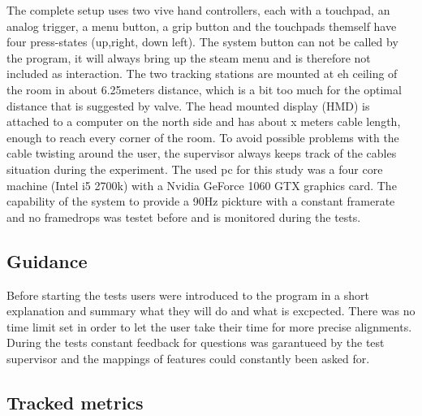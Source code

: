 \documentclass[hyperref,english,bachelorofscience,bibnum]{cgvpub}
\begin{document}
The complete setup uses two vive hand controllers, each with a touchpad, an analog trigger, a menu button, a grip button and the touchpads themself have four press-states (up,right, down left). The system button can not be called by the program, it will always bring up the steam menu and is therefore not included as interaction. The two tracking stations are mounted at eh ceiling of the room in about 6.25meters distance, which is a bit too much for the optimal distance that is suggested by valve. The head mounted display (HMD) is attached to a computer on the north side and has about x meters cable length, enough to reach every corner of the room. To avoid possible problems with the cable twisting around the user, the supervisor always keeps track of the cables situation during the experiment.
The used pc for this study was a four core machine (Intel i5 2700k) with a Nvidia GeForce 1060 GTX graphics card. The capability of the system to provide a 90Hz pickture with a constant framerate and no framedrops was testet before and is monitored during the tests.

\subsection{Guidance}

Before starting the tests users were introduced to the program in a short explanation and summary what they will do and what is excpected. There was no time limit set in order to let the user take their time for more precise alignments. During the tests constant feedback for questions was garantueed by the test supervisor and the mappings of features could constantly been asked for.

\subsection{Tracked metrics}
\end{document}
